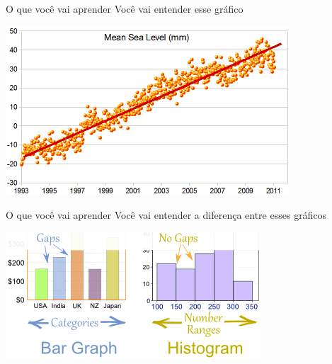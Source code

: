 \documentclass{beamer}
\begin{document}
\begin{frame}{\scriptsize O que você vai aprender}
  \footnotesize
  Você vai entender esse gráfico

  \bigskip
  \begin{center}
    \includegraphics[width=.7\textwidth]{Cap1/mean-sea-level-line}
  \end{center}
\end{frame}

\begin{frame}{\scriptsize O que você vai aprender}
  \footnotesize
  Você vai entender a diferença entre esses gráficos

  \bigskip
  \begin{center}
    \includegraphics[width=.7\textwidth]{Cap1/bar-chart-vs-histogram}
  \end{center}
\end{frame}
\end{document}
